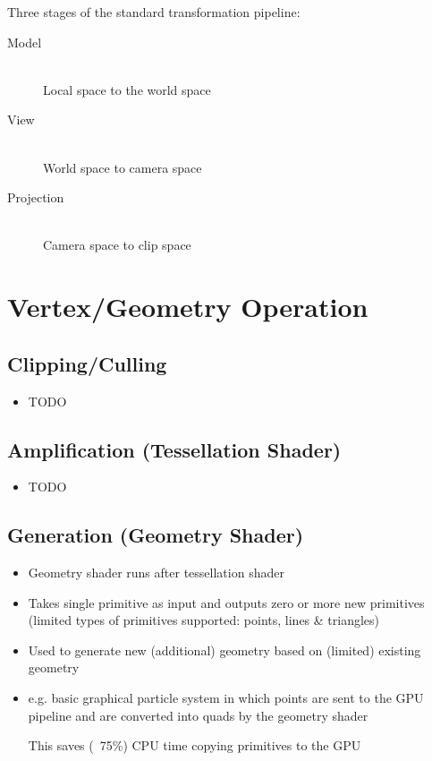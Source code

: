 \documentclass[a4paper]{article}
\begin{document}
Three stages of the standard transformation pipeline:

\begin{description}
  \item[Model] \hfill \\
    Local space to the world space

  \item[View] \hfill \\
    World space to camera space

  \item[Projection] \hfill \\
    Camera space to clip space

\end{description}

\section{Vertex/Geometry Operation}

\subsection{Clipping/Culling}

\begin{itemize}
  \item
    TODO

\end{itemize}

\subsection{Amplification (Tessellation Shader)}

\begin{itemize}
  \item
    TODO

\end{itemize}

\subsection{Generation (Geometry Shader)}

\begin{itemize}
  \item
    Geometry shader runs after tessellation shader

  \item
    Takes single primitive as input and outputs zero or more new primitives
    (limited types of primitives supported: points, lines \& triangles)

  \item
    Used to generate new (additional) geometry based on (limited) existing
    geometry

  \item
    e.g. basic graphical particle system in which points are sent to the GPU
    pipeline and are converted into quads by the geometry shader

    This saves (~75\%) CPU time copying primitives to the GPU

\end{itemize}
\end{document}
